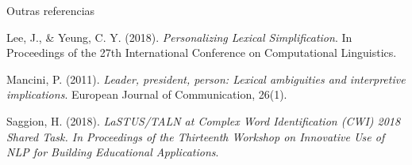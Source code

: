 \documentclass{article}
\begin{document}
Outras referencias

Lee, J., & Yeung, C. Y. (2018). \textit{Personalizing Lexical Simplification}. In Proceedings of the 27th International Conference on Computational Linguistics.

Mancini, P. (2011). \textit{Leader, president, person: Lexical ambiguities and interpretive implications}. European Journal of Communication, 26(1).

Saggion, H. (2018). \textit{LaSTUS/TALN at Complex Word Identification (CWI) 2018 Shared Task. In Proceedings of the Thirteenth Workshop on Innovative Use of NLP for Building Educational Applications}.
\end{document}
